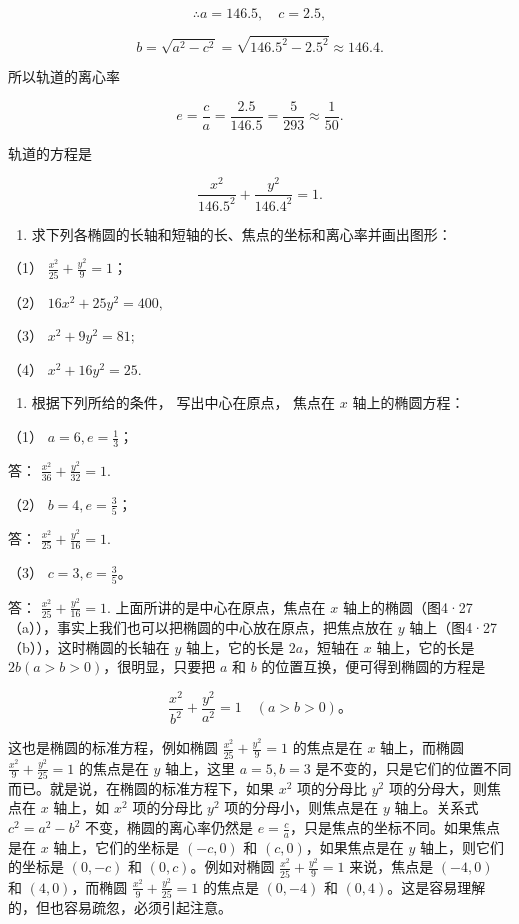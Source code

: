 \[
\therefore a = 146. 5, \quad c = 2. 5,
\]

\[
b = \sqrt {a^{2} - c^{2}} = \sqrt {146. 5^{2} - 2. 5^{2}} \approx 146. 4.
\]

所以轨道的离心率

\[
e = \frac {c}{a} = \frac {2. 5}{146. 5} = \frac {5}{293} \approx \frac {1}{50}.
\]

轨道的方程是

\[
\frac {x^{2}}{146. 5^{2}} + \frac {y^{2}}{146. 4^{2}} = 1.
\]

\begin{enumerate}
\def\labelenumi{\arabic{enumi}.}
\tightlist
\item
  求下列各椭圆的长轴和短轴的长、焦点的坐标和离心率并画出图形：
\end{enumerate}

（1） \(\frac{x^2}{25} + \frac{y^2}{9} = 1\)；

（2） \(16x^{2} + 25y^{2} = 400,\)

（3） \(x^{2} + 9y^{2} = 81;\)

（4） \(x^{2} + 16y^{2} = 25.\)

\begin{enumerate}
\def\labelenumi{\arabic{enumi}.}
\setcounter{enumi}{1}
\tightlist
\item
  根据下列所给的条件， 写出中心在原点， 焦点在 \(x\) 轴上的椭圆方程：
\end{enumerate}

（1） \(a = 6, e = \frac{1}{3}\)；

答： \(\frac{x^2}{36} +\frac{y^2}{32} = 1.\)

（2） \(b = 4, e = \frac{3}{5}\)；

答： \(\frac{x^2}{25} +\frac{y^2}{16} = 1.\)

（3） \(c = 3, e = \frac{3}{5}\)。

答： \(\frac{x^2}{25} +\frac{y^2}{16} = 1.\)
上面所讲的是中心在原点，焦点在 \(x\)
轴上的椭圆（图4·27（a）），事实上我们也可以把椭圆的中心放在原点，把焦点放在
\(y\) 轴上（图4·27（b）），这时椭圆的长轴在 \(y\) 轴上，它的长是
\(2a\)，短轴在 \(x\) 轴上，它的长是 \(2b(a > b > 0)\)，很明显，只要把
\(a\) 和 \(b\) 的位置互换，便可得到椭圆的方程是

\[
\frac {x^{2}}{b^{2}} + \frac {y^{2}}{a^{2}} = 1 \quad (a > b > 0)\text{。}
\]

这也是椭圆的标准方程，例如椭圆 \(\frac{x^2}{25} +\frac{y^2}{9} = 1\)
的焦点是在 \(x\) 轴上，而椭圆 \(\frac{x^2}{9} + \frac{y^2}{25} = 1\)
的焦点是在 \(y\) 轴上，这里 \(a = 5, b = 3\)
是不变的，只是它们的位置不同而已。就是说，在椭圆的标准方程下，如果
\(x^2\) 项的分母比 \(y^2\) 项的分母大，则焦点在 \(x\) 轴上，如 \(x^2\)
项的分母比 \(y^2\) 项的分母小，则焦点是在 \(y\) 轴上。关系式
\(c^2 = a^2 - b^2\) 不变，椭圆的离心率仍然是
\(e = \frac{c}{a}\)，只是焦点的坐标不同。如果焦点是在 \(x\)
轴上，它们的坐标是 \((-c, 0)\) 和 \((c, 0)\)，如果焦点是在 \(y\)
轴上，则它们的坐标是 \((0, -c)\) 和 \((0, c)\)。例如对椭圆
\(\frac{x^2}{25} + \frac{y^2}{9} = 1\) 来说，焦点是 \((-4, 0)\) 和
\((4, 0)\)，而椭圆 \(\frac{x^2}{9} + \frac{y^2}{25} = 1\) 的焦点是
\((0, -4)\) 和 \((0, 4)\)。这是容易理解的，但也容易疏忽，必须引起注意。

